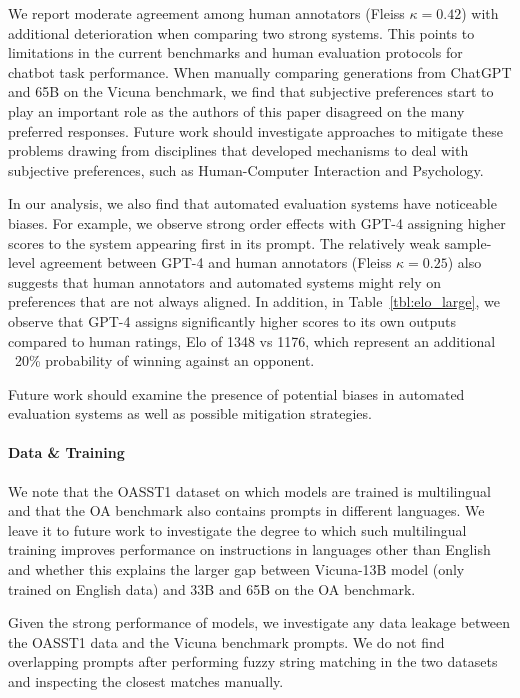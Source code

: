 We report moderate agreement among human annotators (Fleiss $\kappa=0.42$) with additional deterioration when comparing two strong systems. This points to limitations in the current benchmarks and human evaluation protocols for chatbot task performance. When manually comparing generations from ChatGPT and \model 65B on the Vicuna benchmark, we find that subjective preferences start to play an important role as the authors of this paper disagreed on the many preferred responses. Future work should investigate approaches to mitigate these problems drawing from disciplines that developed mechanisms to deal with subjective preferences, such as Human-Computer Interaction and Psychology.


In our analysis, we also find that automated evaluation systems have noticeable biases. For example, we observe strong order effects with GPT-4 assigning higher scores to the system appearing first in its prompt. The relatively weak sample-level agreement between GPT-4 and human annotators (Fleiss $\kappa=0.25$) also suggests that human annotators and automated systems might rely on preferences that are not always aligned. In addition, in Table~\ref{tbl:elo_large}, we observe that GPT-4 assigns significantly higher scores to its own outputs compared to human ratings, Elo of 1348 vs 1176, which represent an additional ~20\% probability of winning against an opponent. 

Future work should examine the presence of potential biases in automated evaluation systems as well as possible mitigation strategies.

\paragraph{Data \& Training}
We note that the OASST1 dataset  on which \model models are trained is multilingual and that the OA benchmark also contains prompts in different languages. We leave it to future work to investigate the degree to which such multilingual training improves performance on instructions in languages other than English and whether this explains the larger gap between Vicuna-13B model (only trained on English data) and \model 33B and 65B on the OA benchmark.




Given the strong performance of \model models, we investigate any data leakage between the OASST1 data and the Vicuna benchmark prompts. We do not find overlapping prompts after performing fuzzy string matching in the two datasets and inspecting the closest matches manually.


